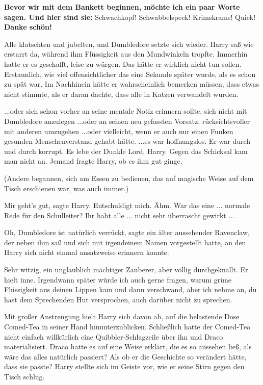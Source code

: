 \textbf{\glqq{}Bevor wir mit dem Bankett beginnen, möchte ich ein paar Worte
sagen. Und hier sind sie:} Schwachkopf! Schwabbelspeck! Krimskrams! Quiek!
\textbf{Danke schön!\grqq{}}

Alle klatschten und jubelten, und Dumbledore setzte sich wieder. Harry saß wie
erstarrt da, während ihm Flüssigkeit aus den Mundwinkeln tropfte. Immerhin hatte
er es geschafft, leise zu würgen. Das hätte er wirklich nicht tun sollen.
Erstaunlich, wie viel offensichtlicher das eine Sekunde später wurde, als es
schon zu spät war. Im Nachhinein hätte er wahrscheinlich bemerken müssen, dass
etwas nicht stimmte, als er daran dachte, dass alle in Katzen verwandelt wurden.

...oder sich schon vorher an seine mentale Notiz erinnern sollte, sich nicht mit
Dumbledore anzulegen ...oder an seinen neu gefassten Vorsatz, rücksichtsvoller
mit anderen umzugehen ...oder vielleicht, wenn er auch nur einen Funken gesunden
Menschenverstand gehabt hätte. ...es war hoffnungslos. Er war durch und durch
korrupt. Es lebe der Dunkle Lord, Harry. Gegen das Schicksal kam man nicht an.
Jemand fragte Harry, ob es ihm gut ginge.

(Andere begannen, sich am Essen zu bedienen, das auf magische Weise auf dem
Tisch erschienen war, was auch immer.)

\glqq{}Mir geht's gut\grqq{}, sagte Harry. \glqq{}Entschuldigt mich. Ähm. War
das eine ... normale Rede für den Schulleiter? Ihr habt alle ... nicht sehr
überrascht gewirkt ...\grqq{}

\glqq{}Oh, Dumbledore ist natürlich verrückt\grqq{}, sagte ein älter aussehender
Ravenclaw, der neben ihm saß und sich mit irgendeinem Namen vorgestellt hatte,
an den Harry sich nicht einmal ansatzweise erinnern konnte.

\glqq{}Sehr witzig, ein unglaublich mächtiger Zauberer, aber völlig
durchgeknallt.\grqq{} Er hielt inne. \glqq{}Irgendwann später würde ich auch
gerne fragen, warum grüne Flüssigkeit aus deinen Lippen kam und dann verschwand,
aber ich nehme an, du hast dem Sprechenden Hut versprochen, auch darüber nicht
zu sprechen.\grqq{}

Mit großer Anstrengung hielt Harry sich davon ab, auf die belastende Dose
Comed-Tea in seiner Hand hinunterzublicken. Schließlich hatte der Comed-Tea
nicht einfach willkürlich eine Quibbler-Schlagzeile über ihn und Draco
materialisiert. Draco hatte es auf eine Weise erklärt, die es so aussehen ließ,
als wäre das alles natürlich passiert? Als ob er die Geschichte so verändert
hätte, dass sie passte? Harry stellte sich im Geiste vor, wie er seine Stirn
gegen den Tisch schlug.

